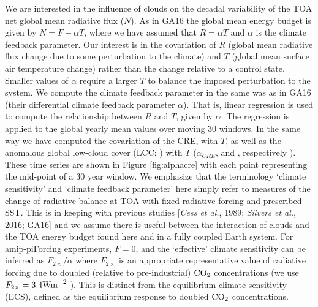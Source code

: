 We are interested in the influence of clouds on the decadal variability of the TOA net global mean radiative flux ($N$).  As in GA16 the global mean energy budget is given by $N=F-\alpha T$, where we have assumed that $R = \alpha T$ and $\alpha$ is the climate feedback parameter.  Our interest is in the covariation of $R$ (global mean  radiative flux change due to some perturbation to the climate) and $T$ (global mean surface air temperature change) rather than the change relative to a control state.  
Smaller values of $\alpha$ require a larger $T$ to balance the imposed perturbation to the system.  
We compute the climate feedback parameter in the same was as in GA16 (their differential climate feedback parameter $\tilde{\alpha}$).  That is, linear regression is used to compute the relationship between $R$ and $T$, given by $\alpha$.  The regression is applied to the global yearly mean values over moving 30 windows.  
In the same way we have computed the covariation of the CRE,  with $T$, as well as the anomalous global low-cloud cover (LCC; ) with $T$ ($\alpha_{CRE}$,  and , respectively ).             
These time series  are shown in Figure 
\ref{fig:alphacre} with each point representing the mid-point of a 30 year window.  
We emphasize that the terminology `climate sensitivity' and `climate feedback parameter' here simply refer to measures of the change of radiative balance at TOA with fixed radiative forcing and prescribed SST.  
This  is in keeping with previous studies [{\textit{Cess et al.}}, 1989; {\textit{Silvers et al.}}, 2016; GA16] and we assume there is useful  between the interaction of clouds and the TOA energy budget found here and in a fully coupled Earth system.  
For amip-piForcing experiments, $F=0$, and the `effective' climate sensitivity can be inferred as $F_{2\times} / \alpha$ where $F_{2\times}$ is an appropriate representative value of radiative forcing due to doubled (relative to pre-industrial) $\rm{CO}_2$ concentrations (we use $F_{2\times}=3.4 \rm{W m}^{-2}$  \citep{Flato_etal_2013}).  This is distinct from the equilibrium climate sensitivity (ECS), defined as the equilibrium response to doubled $\rm{CO}_2$ concentrations. 

